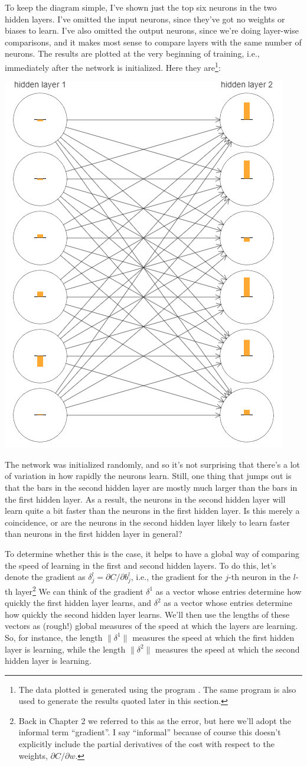 \documentclass[a4paper,twoside,10pt]{book}
\begin{document}
To keep the diagram simple, I've shown just the top six neurons in the two hidden layers. I've omitted the input neurons, since they've got no weights or biases to learn. I've also omitted the output neurons, since we're doing layer-wise comparisons, and it makes most sense to compare layers with the same number of neurons. The results are plotted at the very beginning of training, i.e., immediately after the network is initialized. Here they are\footnote{The data plotted is generated using the program . The same program is also used to generate the results quoted later in this section.}:
\begin{center}
	\includegraphics[width=0.45\linewidth]{figures/ch5/tikz500}
\end{center}
The network was initialized randomly, and so it's not surprising that there's a lot of variation in how rapidly the neurons learn. Still, one thing that jumps out is that the bars in the second hidden layer are mostly much larger than the bars in the first hidden layer. As a result, the neurons in the second hidden layer will learn quite a bit faster than the neurons in the first hidden layer. Is this merely a coincidence, or are the neurons in the second hidden layer likely to learn faster than neurons in the first hidden layer in general?

To determine whether this is the case, it helps to have a global way of comparing the speed of learning in the first and second hidden layers. To do this, let's denote the gradient as $\delta^l_j=\partial C/\partial b^l_j$, i.e., the gradient for the $j$-th neuron in the $l$-th layer\footnote{Back in Chapter 2 we referred to this as the error, but here we'll adopt the informal term ``gradient''. I say ``informal'' because of course this doesn't explicitly include the partial derivatives of the cost with respect to the weights, $\partial C/\partial w$.}  We can think of the gradient $\delta^1$ as a vector whose entries determine how quickly the first hidden layer learns, and $\delta^2$ as a vector whose entries determine how quickly the second hidden layer learns. We'll then use the lengths of these vectors as (rough!) global measures of the speed at which the layers are learning. So, for instance, the length $\|\delta^1\|$ measures the speed at which the first hidden layer is learning, while the length $\|\delta^2\|$ measures the speed at which the second hidden layer is learning.
\end{document}
